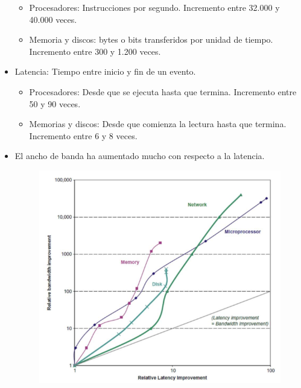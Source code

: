 \documentclass[12pt, twoside, openright]{report} %
\begin{document}
\begin{itemize}
    \begin{itemize}
    
    \item
      Procesadores: Instrucciones por segundo. Incremento entre 32.000 y
      40.000 veces.
    \item
      Memoria y discos: bytes o bits transferidos por unidad de tiempo.
      Incremento entre 300 y 1.200 veces.
    \end{itemize}
  \item
    Latencia: Tiempo entre inicio y fin de un evento.

    \begin{itemize}
    
    \item
      Procesadores: Desde que se ejecuta hasta que termina. Incremento
      entre 50 y 90 veces.
    \item
      Memorias y discos: Desde que comienza la lectura hasta que
      termina. Incremento entre 6 y 8 veces.
    \end{itemize}
  \item
    El ancho de banda ha aumentado mucho con respecto a la latencia.

   
    \begin{figure}[H]
      {\includegraphics[scale=.4]{Untitled 5.png}}
    \end{figure}
  \end{itemize}
\end{document}
